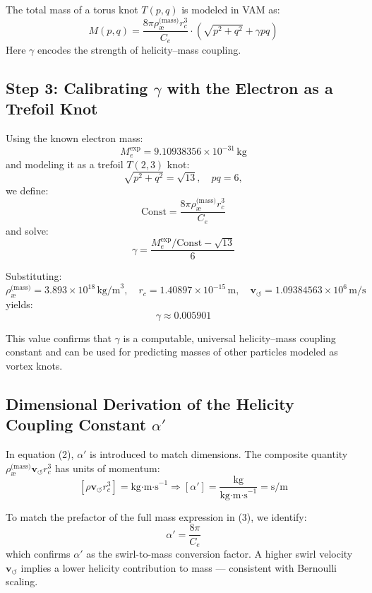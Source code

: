 The total mass of a torus knot \( T(p,q) \) is modeled in VAM as:
\[
M(p,q) = \frac{8\pi \rho_\text{\ae}^{\text{(mass)}} r_c^3}{C_e} \cdot \left( \sqrt{p^2 + q^2} + \gamma pq \right)
\tag{3}
\]
Here \( \gamma \) encodes the strength of helicity–mass coupling.

\subsection*{Step 3: Calibrating \( \gamma \) with the Electron as a Trefoil Knot}

Using the known electron mass:
\[
M_e^{\text{exp}} = 9.10938356 \times 10^{-31} \, \text{kg}
\]
and modeling it as a trefoil \( T(2,3) \) knot:
\[
\sqrt{p^2 + q^2} = \sqrt{13}, \quad pq = 6,
\]
we define:
\[
\text{Const} = \frac{8\pi \rho_\text{\ae}^{\text{(mass)}} r_c^3}{C_e}
\]
and solve:
\[
\gamma = \frac{M_e^{\text{exp}} / \text{Const} - \sqrt{13}}{6}
\]

Substituting:
\[
\rho_\text{\ae}^{\text{(mass)}} = 3.893 \times 10^{18} \, \text{kg/m}^3, \quad
r_c = 1.40897 \times 10^{-15} \, \text{m}, \quad
\mathbf{v}_{\scriptscriptstyle\boldsymbol{\circlearrowleft}} = 1.09384563 \times 10^6 \, \text{m/s}
\]
yields:
\[
\boxed{\gamma \approx 0.005901}
\]

This value confirms that \( \gamma \) is a computable, universal helicity–mass coupling constant and can be used for predicting masses of other particles modeled as vortex knots.

\subsection*{Dimensional Derivation of the Helicity Coupling Constant \( \alpha' \)}

In equation (2), \( \alpha' \) is introduced to match dimensions. The composite quantity \( \rho_\text{\ae}^{\text{(mass)}} \mathbf{v}_{\scriptscriptstyle\boldsymbol{\circlearrowleft}} r_c^3 \) has units of momentum:
\[
[\rho \mathbf{v}_{\scriptscriptstyle\boldsymbol{\circlearrowleft}} r_c^3] = \text{kg·m·s}^{-1}
\Rightarrow
[\alpha'] = \frac{\text{kg}}{\text{kg·m·s}^{-1}} = \text{s/m}
\]

To match the prefactor of the full mass expression in (3), we identify:
\[
\boxed{\alpha' = \frac{8\pi}{C_e}}
\]
which confirms \( \alpha' \) as the swirl-to-mass conversion factor. A higher swirl velocity \( \mathbf{v}_{\scriptscriptstyle\boldsymbol{\circlearrowleft}} \) implies a lower helicity contribution to mass — consistent with Bernoulli scaling.

